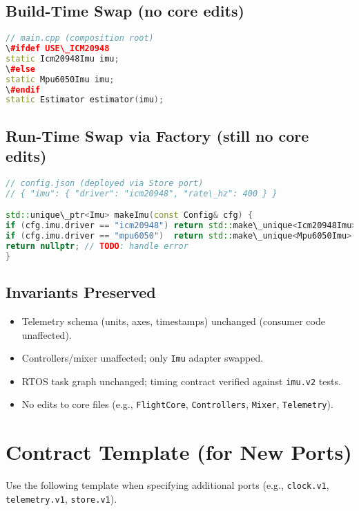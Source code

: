 \subsection{Build-Time Swap (no core edits)}
\begin{lstlisting}[language=C++]
// main.cpp (composition root)
\#ifdef USE\_ICM20948
static Icm20948Imu imu;
\#else
static Mpu6050Imu imu;
\#endif
static Estimator estimator(imu);
\end{lstlisting}

\subsection{Run-Time Swap via Factory (still no core edits)}
\begin{lstlisting}[language=C++]
// config.json (deployed via Store port)
// { "imu": { "driver": "icm20948", "rate\_hz": 400 } }

std::unique\_ptr<Imu> makeImu(const Config& cfg) {
if (cfg.imu.driver == "icm20948") return std::make\_unique<Icm20948Imu>(cfg);
if (cfg.imu.driver == "mpu6050")  return std::make\_unique<Mpu6050Imu>(cfg);
return nullptr; // TODO: handle error
}
\end{lstlisting}

\subsection{Invariants Preserved}
\begin{itemize}
\item Telemetry schema (units, axes, timestamps) unchanged (consumer code unaffected).
\item Controllers/mixer unaffected; only \texttt{Imu} adapter swapped.
\item RTOS task graph unchanged; timing contract verified against \texttt{imu.v2} tests.
\item No edits to core files (e.g., \texttt{FlightCore}, \texttt{Controllers}, \texttt{Mixer}, \texttt{Telemetry}).
\end{itemize}

\section{Contract Template (for New Ports)}\label{sec:contract-template}
Use the following template when specifying additional ports (e.g., \texttt{clock.v1}, \texttt{telemetry.v1}, \texttt{store.v1}).

